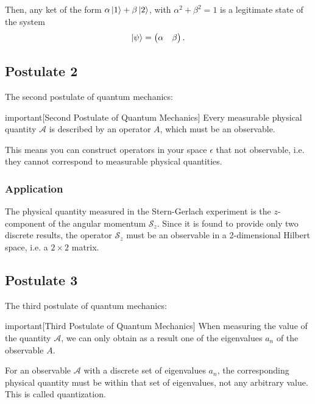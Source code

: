 \documentclass{article}
\begin{document}
Then, any ket of the form $\alpha \ket{1}+\beta \ket{2}$, with $\alpha^2+\beta^2=1$ is a legitimate state of the system
\[
    \ket{\psi }=\begin{pmatrix}
        \alpha & \beta 
    \end{pmatrix}.
\]

\subsection{Postulate 2}
The second postulate of quantum mechanics:
\begin{callout}{important}[Second Postulate of Quantum Mechanics]
\label{important:s3-p2}
Every measurable physical quantity $\mathcal{A}$ is described by an operator $A$, which must be an observable.
\end{callout}

This means you can construct operators in your space $\epsilon $ that not observable, i.e. they cannot correspond to measurable physical quantities.

\subsubsection{Application}
The physical quantity measured in the Stern-Gerlach experiment is the $z$-component of the angular momentum $\mathcal{S}_z$. Since it is found to provide only two discrete results, the operator $\mathcal{S}_z$ must be an observable in a 2-dimensional Hilbert space, i.e. a $2\times 2$ matrix.

\subsection{Postulate 3}
The third postulate of quantum mechanics:
\begin{callout*}{important}[Third Postulate of Quantum Mechanics]
\label{important:s3-p3}
When measuring the value of the quantity $\mathcal{A}$, we can only obtain as a result one of the eigenvalues $a_n$ of the observable $A$.
\end{callout*}
For an observable $\mathcal{A}$ with a discrete set of eigenvalues $a_n$, the corresponding physical quantity must be within that set of eigenvalues, not any arbitrary value. This is called quantization.
\end{document}

